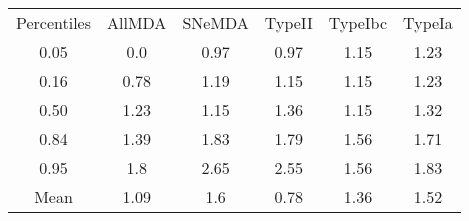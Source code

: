 \begin{table}
\begin{tabular}{cccccc}
Percentiles & AllMDA & SNeMDA & TypeII & TypeIbc & TypeIa \\
0.05 & 0.0 & 0.97 & 0.97 & 1.15 & 1.23 \\
0.16 & 0.78 & 1.19 & 1.15 & 1.15 & 1.23 \\
0.50 & 1.23 & 1.15 & 1.36 & 1.15 & 1.32 \\
0.84 & 1.39 & 1.83 & 1.79 & 1.56 & 1.71 \\
0.95 & 1.8 & 2.65 & 2.55 & 1.56 & 1.83 \\
Mean & 1.09 & 1.6 & 0.78 & 1.36 & 1.52 \\
\end{tabular}
\end{table}
